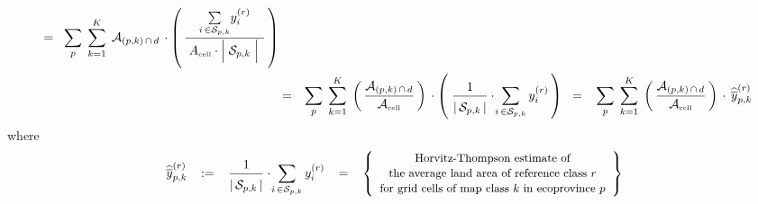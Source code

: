\begin{eqnarray*}
\;\; = \;\;
	\underset{p}{\sum}\;\,
	\overset{K}{\underset{k=1}{\sum}}\;\,
	\mathcal{A}_{(p,k)\,\cap\,d}
	\,\cdot
	\left(\,
		\dfrac{
			\underset{i\,\in\mathcal{S}_{p,k}}{\sum} y^{(r)}_{i}
			}{
			{\color{white}.}
			A_{\textnormal{{\tiny cell}}}
			\cdot
			\left\vert\;
				\overset{{\color{white}.}}{\mathcal{S}_{p,k}}
				\;\right\vert
			{\color{white}.}
			}
		\,\right)
\\
& = &
	\underset{p}{\sum}\;\,
	\overset{K}{\underset{k=1}{\sum}}\;
	\left(\,
		\dfrac{
			\mathcal{A}_{(p,k)\,\cap\,d} %
			}{
			\mathcal{A}_{\textnormal{{\tiny cell}}}
			}
		\,\right)
	\,\cdot
	\left(\;
		\dfrac{1}{\vert\,\overset{{\color{white}.}}{\mathcal{S}_{p,k}}\,\vert}
		\cdot\!
		\underset{i\,\in\mathcal{S}_{p,k}}{\sum}\,y^{(r)}_{i}
		\,\right)
\;\; = \;\;\;
	\underset{p}{\sum}\;\,
	\overset{K}{\underset{k=1}{\sum}}\;
	\left(\,
		\dfrac{
			\mathcal{A}_{(p,k)\,\cap\,d} %
			}{
			\mathcal{A}_{\textnormal{{\tiny cell}}}
			}
		\,\right)
	\,\cdot\,
	\widehat{\overline{y}}^{(r)}_{p,k}
\end{eqnarray*}
\noindent
where
\begin{equation*}
\widehat{\overline{y}}^{(r)}_{p,k}
\;\;\; := \;\;\;
	\dfrac{1}{\vert\,\overset{{\color{white}.}}{\mathcal{S}_{p,k}}\,\vert}
	\cdot\!
	\underset{i\,\in\mathcal{S}_{p,k}}{\sum}\,y^{(r)}_{i}
\;\;\; = \;\;\;
	\left\{\begin{array}{c}
	\textnormal{\small Horvitz-Thompson estimate of}
	\\
	\textnormal{\small the average land area of reference class $r$}
	\\
	\textnormal{\small for grid cells of map class $k$ in ecoprovince $p$}
	\end{array}\right\}
\end{equation*}
